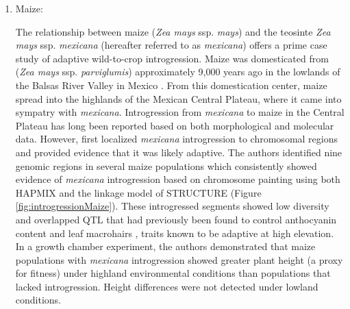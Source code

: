 \documentclass[11pt]{article}
\begin{document}
\begin{enumerate}
\item{Maize:}






The relationship between maize (\emph{Zea mays} ssp. \emph{mays}) and the teosinte \emph{Zea mays} ssp. \emph{mexicana} (hereafter referred to as \emph{mexicana}) offers a prime case study of adaptive wild-to-crop introgression.
Maize was domesticated from (\emph{Zea mays} ssp. \emph{parviglumis}) approximately 9,000 years ago in the lowlands of the Balsas River Valley in Mexico \cite{matsuoka2002single}.
From this domestication center, maize spread into the highlands of the Mexican Central Plateau, where it came into sympatry with \emph{mexicana}.
Introgression from \emph{mexicana} to maize in the Central Plateau has long been reported based on both morphological \cite {wilkes1977, lauter2004, doebley1984} and molecular \cite{matsuoka2002, vanHeerwaarden2011, doebley1987, warburton2011, fukunaga2005} data.
However, \citep{hufford2013} first localized \emph{mexicana} introgression to chromosomal regions and provided evidence that it was likely adaptive.
The authors identified nine genomic regions in several maize populations which consistently showed evidence of \emph{mexicana} introgression based on chromosome painting using both HAPMIX and the linkage model of STRUCTURE (Figure \ref{fig:introgressionMaize}).
These introgressed segments showed low diversity and overlapped QTL that had previously been found to control anthocyanin content and leaf macrohairs \cite{lauter2004}, traits known to be adaptive at high elevation.
In a growth chamber experiment, the authors demonstrated that maize populations with \emph{mexicana} introgression showed greater plant height (a proxy for fitness) under highland environmental conditions than populations that lacked introgression.
Height differences were not detected under lowland conditions.



\end{enumerate}
\end{document}
